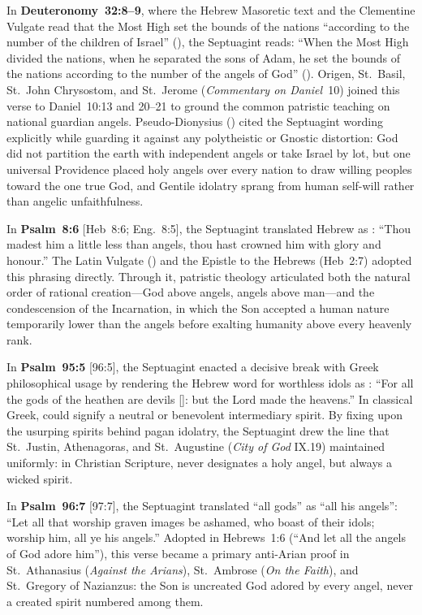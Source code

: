 In \textbf{Deuteronomy~32:8--9}, where the Hebrew Masoretic text and the Clementine Vulgate read that the Most High set the bounds of the nations ``according to the number of the children of Israel'' (), the Septuagint reads: ``When the Most High divided the nations, when he separated the sons of Adam, he set the bounds of the nations according to the number of the angels of God'' (). Origen, St.~Basil, St.~John Chrysostom, and St.~Jerome (\emph{Commentary on Daniel}~10) joined this verse to Daniel~10:13 and 20--21 to ground the common patristic teaching on national guardian angels. Pseudo-Dionysius () cited the Septuagint wording explicitly while guarding it against any polytheistic or Gnostic distortion: God did not partition the earth with independent angels or take Israel by lot, but one universal Providence placed holy angels over every nation to draw willing peoples toward the one true God, and Gentile idolatry sprang from human self-will rather than angelic unfaithfulness.

In \textbf{Psalm~8:6} [Heb~8:6; Eng.~8:5], the Septuagint translated Hebrew  as : ``Thou madest him a little less than angels, thou hast crowned him with glory and honour.'' The Latin Vulgate () and the Epistle to the Hebrews (Heb~2:7) adopted this phrasing directly. Through it, patristic theology articulated both the natural order of rational creation---God above angels, angels above man---and the condescension of the Incarnation, in which the Son accepted a human nature temporarily lower than the angels before exalting humanity above every heavenly rank.

In \textbf{Psalm~95:5} [96:5], the Septuagint enacted a decisive break with Greek philosophical usage by rendering the Hebrew word for worthless idols as : ``For all the gods of the heathen are devils []: but the Lord made the heavens.'' In classical Greek,  could signify a neutral or benevolent intermediary spirit. By fixing  upon the usurping spirits behind pagan idolatry, the Septuagint drew the line that St.~Justin, Athenagoras, and St.~Augustine (\emph{City of God} IX.19) maintained uniformly: in Christian Scripture,  never designates a holy angel, but always a wicked spirit.

In \textbf{Psalm~96:7} [97:7], the Septuagint translated ``all gods'' as ``all his angels'': ``Let all that worship graven images be ashamed, who boast of their idols; worship him, all ye his angels.'' Adopted in Hebrews~1:6 (``And let all the angels of God adore him''), this verse became a primary anti-Arian proof in St.~Athanasius (\emph{Against the Arians}), St.~Ambrose (\emph{On the Faith}), and St.~Gregory of Nazianzus: the Son is uncreated God adored by every angel, never a created spirit numbered among them.

